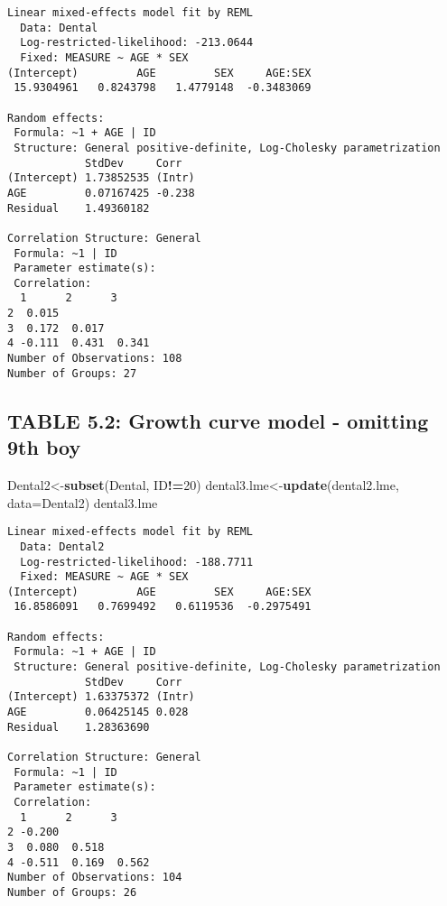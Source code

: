 \documentclass[]{book}
\newenvironment{Shaded}{\begin{snugshade}}{\end{snugshade}}
\newcommand{\DataTypeTok}[1]{\textcolor[rgb]{0.13,0.29,0.53}{#1}}
\newcommand{\DecValTok}[1]{\textcolor[rgb]{0.00,0.00,0.81}{#1}}
\newcommand{\KeywordTok}[1]{\textcolor[rgb]{0.13,0.29,0.53}{\textbf{#1}}}
\newcommand{\NormalTok}[1]{#1}
\newcommand{\OperatorTok}[1]{\textcolor[rgb]{0.81,0.36,0.00}{\textbf{#1}}}
\begin{document}
\begin{verbatim}
Linear mixed-effects model fit by REML
  Data: Dental 
  Log-restricted-likelihood: -213.0644
  Fixed: MEASURE ~ AGE * SEX 
(Intercept)         AGE         SEX     AGE:SEX 
 15.9304961   0.8243798   1.4779148  -0.3483069 

Random effects:
 Formula: ~1 + AGE | ID
 Structure: General positive-definite, Log-Cholesky parametrization
            StdDev     Corr  
(Intercept) 1.73852535 (Intr)
AGE         0.07167425 -0.238
Residual    1.49360182       

Correlation Structure: General
 Formula: ~1 | ID 
 Parameter estimate(s):
 Correlation: 
  1      2      3     
2  0.015              
3  0.172  0.017       
4 -0.111  0.431  0.341
Number of Observations: 108
Number of Groups: 27 
\end{verbatim}

\hypertarget{table-5.2-growth-curve-model---omitting-9th-boy}{%
\subsection{TABLE 5.2: Growth curve model - omitting 9th boy}\label{table-5.2-growth-curve-model---omitting-9th-boy}}

\begin{Shaded}
\begin{Highlighting}[]
\NormalTok{Dental2<-}\KeywordTok{subset}\NormalTok{(Dental, ID}\OperatorTok{!=}\DecValTok{20}\NormalTok{)}
\NormalTok{dental3.lme<-}\KeywordTok{update}\NormalTok{(dental2.lme, }\DataTypeTok{data=}\NormalTok{Dental2)}
\NormalTok{dental3.lme}
\end{Highlighting}
\end{Shaded}

\begin{verbatim}
Linear mixed-effects model fit by REML
  Data: Dental2 
  Log-restricted-likelihood: -188.7711
  Fixed: MEASURE ~ AGE * SEX 
(Intercept)         AGE         SEX     AGE:SEX 
 16.8586091   0.7699492   0.6119536  -0.2975491 

Random effects:
 Formula: ~1 + AGE | ID
 Structure: General positive-definite, Log-Cholesky parametrization
            StdDev     Corr  
(Intercept) 1.63375372 (Intr)
AGE         0.06425145 0.028 
Residual    1.28363690       

Correlation Structure: General
 Formula: ~1 | ID 
 Parameter estimate(s):
 Correlation: 
  1      2      3     
2 -0.200              
3  0.080  0.518       
4 -0.511  0.169  0.562
Number of Observations: 104
Number of Groups: 26 
\end{verbatim}
\end{document}
